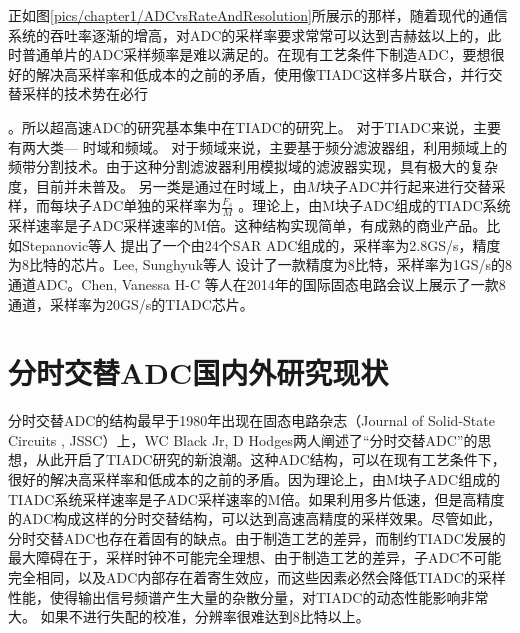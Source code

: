 	正如图\ref {pics/chapter1/ADCvsRateAndResolution}所展示的那样，随着现代的通信系统的吞吐率逐渐的增高，对ADC的采样率要求常常可以达到吉赫兹以上的，此时普通单片的ADC采样频率是难以满足的。在现有工艺条件下制造ADC，要想很好的解决高采样率和低成本的之前的矛盾，使用像TIADC这样多片联合，并行交替采样的技术势在必行\cite{black1980time}\par。所以超高速ADC的研究基本集中在TIADC的研究上。
	对于TIADC来说，主要有两大类--- 时域和频域。
	对于频域来说，主要基于频分滤波器组，利用频域上的频带分割技术。由于这种分割滤波器利用模拟域的滤波器实现，具有极大的复杂度，目前并未普及。
	另一类是通过在时域上，由$M$块子ADC并行起来进行交替采样，而每块子ADC单独的采样率为$\frac{F_s}{M}$
	。理论上，由M块子ADC组成的TIADC系统采样速率是子ADC采样速率的M倍。这种结构实现简单，有成熟的商业产品。比如Stepanovic等人\cite{stepanovic20132} 提出了一个由24个SAR ADC组成的，采样率为2.8GS/s，精度为8比特的芯片。Lee, Sunghyuk等人\cite {lee20141} 设计了一款精度为8比特，采样率为1GS/s的8通道ADC。Chen, Vanessa H-C \cite {chen201469}等人在2014年的国际固态电路会议上展示了一款8通道，采样率为20GS/s的TIADC芯片。
	
\section {分时交替ADC国内外研究现状}
	
	分时交替ADC的结构最早于1980年出现在固态电路杂志（Journal of Solid-State Circuits , JSSC）上，WC Black Jr, D Hodges两人阐述了“分时交替ADC”的思想，从此开启了TIADC研究的新浪潮。这种ADC结构，可以在现有工艺条件下，很好的解决高采样率和低成本的之前的矛盾。因为理论上，由M块子ADC组成的TIADC系统采样速率是子ADC采样速率的M倍。如果利用多片低速，但是高精度的ADC构成这样的分时交替结构，可以达到高速高精度的采样效果。尽管如此，分时交替ADC也存在着固有的缺点。由于制造工艺的差异，而制约TIADC发展的最大障碍在于，采样时钟不可能完全理想、由于制造工艺的差异，子ADC不可能完全相同，以及ADC内部存在着寄生效应，而这些因素必然会降低TIADC的采样性能，使得输出信号频谱产生大量的杂散分量，对TIADC的动态性能影响非常大。 如果不进行失配的校准，分辨率很难达到8比特以上。\par
	
